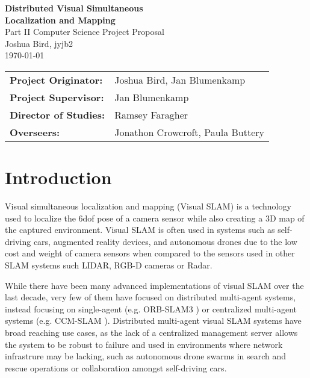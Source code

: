 \documentclass[12pt,a4paper,twoside]{article}
\begin{document}

\begin{titlepage}

    \vspace*{\fill}

    \begin{center}
        \Huge
        \textbf{Distributed Visual Simultaneous \\ Localization and Mapping} \\[6mm]
        \Large
        Part II Computer Science Project Proposal \\[2mm]
        Joshua Bird, jyjb2 \\[2mm]
        \today \\[8mm]
    \end{center}

    \vspace{150pt}

    {\large
        \begin{tabular}{ll}
            \bf Project Originator:  & Joshua Bird, Jan Blumenkamp       \\[4mm]
            \bf Project Supervisor:  & Jan Blumenkamp                    \\[4mm]
            \bf Director of Studies: & Ramsey Faragher                   \\[4mm]
            \bf Overseers:           & Jonathon Crowcroft, Paula Buttery
        \end{tabular}
    }

    \vspace{170pt}

\end{titlepage}

\section{Introduction}

Visual simultaneous localization and mapping (Visual SLAM) is a technology used to localize the 6dof pose of a camera sensor while also creating a 3D map of the captured environment. Visual SLAM is often used in systems such as self-driving cars, augmented reality devices, and autonomous drones due to the low cost and weight of camera sensors when compared to the sensors used in other SLAM systems such LIDAR, RGB-D cameras or Radar.

While there have been many advanced implementations of visual SLAM over the last decade, very few of them have focused on distributed multi-agent systems, instead focusing on single-agent (e.g. ORB-SLAM3 \autocite{ORBSLAM3_TRO}) or centralized multi-agent systems (e.g. CCM-SLAM \autocite{schmuck2019ccm}). Distributed multi-agent visual SLAM systems have broad reaching use cases, as the lack of a centralized management server allows the system to be robust to failure and used in environments where network infrastrure may be lacking, such as autonomous drone swarms in search and rescue operations or collaboration amongst self-driving cars.
\end{document}
